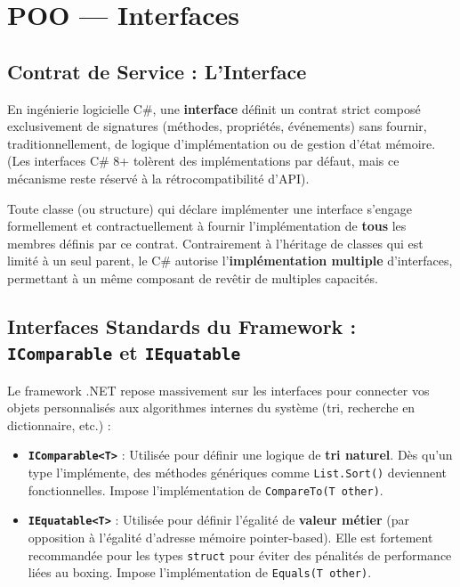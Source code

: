 
\newpage
\section{POO — Interfaces}

\subsection{Contrat de Service : L'Interface}

En ingénierie logicielle C\#, une \textbf{interface} définit un contrat strict composé exclusivement de signatures (méthodes, propriétés, événements) sans fournir, traditionnellement, de logique d'implémentation ou de gestion d'état mémoire. (Les interfaces C\# 8+ tolèrent des implémentations par défaut, mais ce mécanisme reste réservé à la rétrocompatibilité d'API).

Toute classe (ou structure) qui déclare implémenter une interface s'engage formellement et contractuellement à fournir l'implémentation de \textbf{tous} les membres définis par ce contrat. Contrairement à l'héritage de classes qui est limité à un seul parent, le C\# autorise l'\textbf{implémentation multiple} d'interfaces, permettant à un même composant de revêtir de multiples capacités.

\subsection{Interfaces Standards du Framework : \texttt{IComparable} et \texttt{IEquatable}}

Le framework .NET repose massivement sur les interfaces pour connecter vos objets personnalisés aux algorithmes internes du système (tri, recherche en dictionnaire, etc.) :
\begin{itemize}
    \item \textbf{\texttt{IComparable<T>}} : Utilisée pour définir une logique de \textbf{tri naturel}. Dès qu'un type l'implémente, des méthodes génériques comme \texttt{List.Sort()} deviennent fonctionnelles. Impose l'implémentation de \texttt{CompareTo(T other)}.
    \item \textbf{\texttt{IEquatable<T>}} : Utilisée pour définir l'égalité de \textbf{valeur métier} (par opposition à l'égalité d'adresse mémoire pointer-based). Elle est fortement recommandée pour les types \texttt{struct} pour éviter des pénalités de performance liées au boxing. Impose l'implémentation de \texttt{Equals(T other)}.
\end{itemize}

